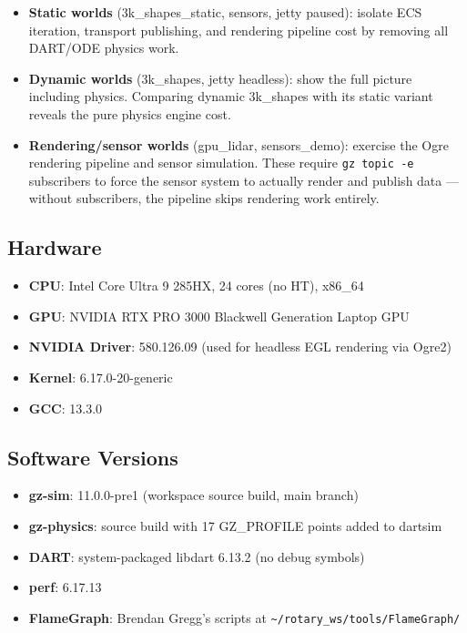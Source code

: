 \documentclass[11pt, a4paper]{article}
\providecommand{\tightlist}{%
  \setlength{\itemsep}{0pt}\setlength{\parskip}{0pt}}
\begin{document}
\begin{itemize}
\tightlist
\item
  \textbf{Static worlds} (3k\_shapes\_static, sensors, jetty paused):
  isolate ECS iteration, transport publishing, and rendering pipeline
  cost by removing all DART/ODE physics work.
\item
  \textbf{Dynamic worlds} (3k\_shapes, jetty headless): show the full
  picture including physics. Comparing dynamic 3k\_shapes with its
  static variant reveals the pure physics engine cost.
\item
  \textbf{Rendering/sensor worlds} (gpu\_lidar, sensors\_demo): exercise
  the Ogre rendering pipeline and sensor simulation. These require
  \texttt{gz\ topic\ -e} subscribers to force the sensor system to
  actually render and publish data --- without subscribers, the pipeline
  skips rendering work entirely.
\end{itemize}

\hypertarget{hardware}{%
\subsection{Hardware}\label{hardware}}

\begin{itemize}
\tightlist
\item
  \textbf{CPU}: Intel Core Ultra 9 285HX, 24 cores (no HT), x86\_64
\item
  \textbf{GPU}: NVIDIA RTX PRO 3000 Blackwell Generation Laptop GPU
\item
  \textbf{NVIDIA Driver}: 580.126.09 (used for headless EGL rendering via Ogre2)
\item
  \textbf{Kernel}: 6.17.0-20-generic
\item
  \textbf{GCC}: 13.3.0
\end{itemize}

\hypertarget{software-versions}{%
\subsection{Software Versions}\label{software-versions}}

\begin{itemize}
\tightlist
\item
  \textbf{gz-sim}: 11.0.0-pre1 (workspace source build, main branch)
\item
  \textbf{gz-physics}: source build with 17 GZ\_PROFILE points added to
  dartsim
\item
  \textbf{DART}: system-packaged libdart 6.13.2 (no debug symbols)
\item
  \textbf{perf}: 6.17.13
\item
  \textbf{FlameGraph}: Brendan Gregg's scripts at
  \texttt{\textasciitilde{}/rotary\_ws/tools/FlameGraph/}
\end{itemize}
\end{document}
